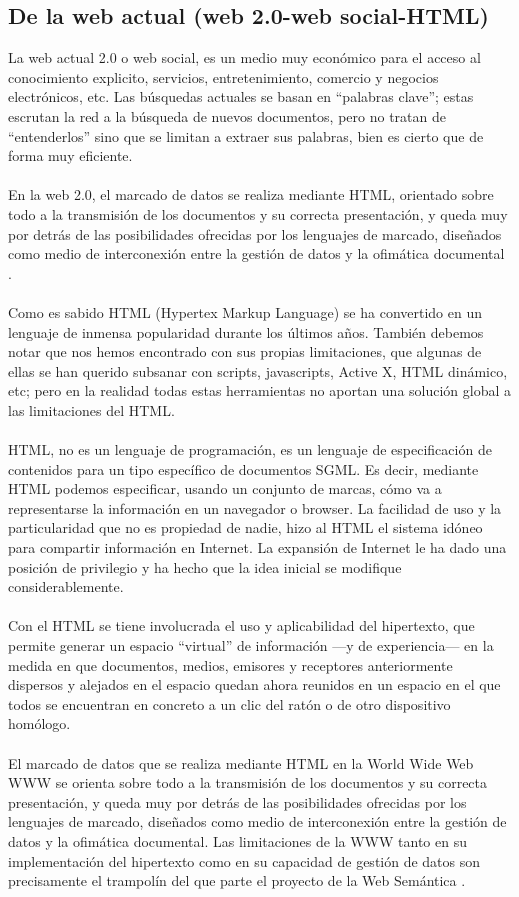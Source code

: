 \documentclass[conference]{IEEEtran}\usepackage[]{graphicx}\usepackage[]{color}
\begin{document}
\subsection{De la web actual (web 2.0-web social-HTML)}
La web actual 2.0 o web social, es un medio muy económico para el acceso al conocimiento explicito, servicios, entretenimiento, comercio y negocios electrónicos, etc. Las búsquedas actuales se basan en “palabras clave”; estas escrutan la red a la búsqueda de nuevos documentos, pero no tratan de “entenderlos” sino que se limitan a extraer sus palabras, bien es cierto que de forma muy eficiente. \\ \\
En la web 2.0, el marcado de datos se realiza mediante HTML, orientado sobre todo a la transmisión de los documentos y su correcta presentación, y queda muy por detrás de las posibilidades ofrecidas por los lenguajes de marcado, diseñados como medio de interconexión entre la gestión de datos y la ofimática documental \cite{biblio8}. \\ \\
Como es sabido HTML (Hypertex Markup Language) se ha convertido en un lenguaje de inmensa popularidad durante los últimos años. También debemos notar que nos hemos encontrado con sus propias limitaciones, que algunas de ellas se han querido subsanar con scripts, javascripts, Active X, HTML dinámico, etc; pero en la realidad todas estas herramientas no aportan una solución global a las limitaciones del HTML. \\ \\
HTML, no es un lenguaje de programación, es un lenguaje de especificación de contenidos para un tipo específico de documentos SGML. Es decir, mediante HTML podemos especificar, usando un conjunto de marcas, cómo va a representarse la información en un navegador o browser. La facilidad de uso y la particularidad que no es propiedad de nadie, hizo al HTML el sistema idóneo para compartir información en Internet. La expansión de Internet le ha dado una posición de privilegio y ha hecho que la idea inicial se modifique considerablemente.\\ \\
Con el HTML se tiene involucrada el uso y aplicabilidad del hipertexto, que permite generar un espacio “virtual” de información —y de experiencia— en la medida en que documentos, medios, emisores y receptores anteriormente dispersos y alejados en el espacio quedan ahora reunidos en un espacio en el que todos se encuentran en concreto a un clic del ratón o de otro dispositivo homólogo. \\ \\
El marcado de datos que se realiza mediante HTML en la World Wide Web WWW se orienta sobre todo a la transmisión de los documentos y su correcta presentación, y queda muy por detrás de las posibilidades ofrecidas por los lenguajes de marcado, diseñados como medio de interconexión entre la gestión de datos y la ofimática documental. Las limitaciones de la WWW tanto en su implementación del hipertexto como en su capacidad de gestión de datos son precisamente el trampolín del que parte el proyecto de la Web Semántica \cite{biblio6}.
\end{document}
